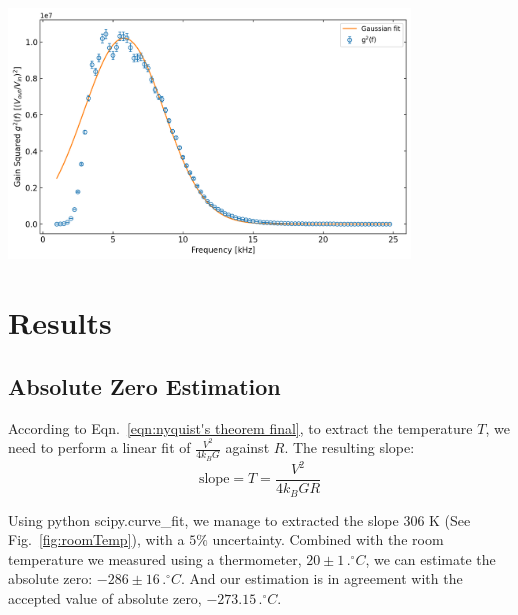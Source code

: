\documentclass[12pt]{article}
\begin{document}
\begin{center}
    \includegraphics[width = 0.8\textwidth]{images/gauss_gain.png}
    \label{fig:gauss_fit}
\end{center}

\section{Results}

\subsection{Absolute Zero Estimation}
\quad According to Eqn.~\ref{eqn:nyquist's theorem final}, to extract the temperature $T$, we need to perform a linear fit of $\frac{V^2}{4k_BG}$ against $R$. The resulting slope:
\begin{equation}
    \text{slope} = T = \frac{V^2}{4k_BGR} \label{eqn:room_temp}
\end{equation}


Using python scipy.curve\_fit, we manage to extracted the slope $306$ K (See Fig.~\ref{fig:roomTemp}), with a $5\%$ uncertainty. Combined with the room temperature we measured using a thermometer, $20 \pm 1 \,\si{.^\circ C}$, we can estimate the absolute zero: $-286 \pm 16\,\si{.^\circ C}$. And our estimation is in agreement with the accepted value of absolute zero, $-273.15\,\si{.^\circ C}$.
\end{document}

